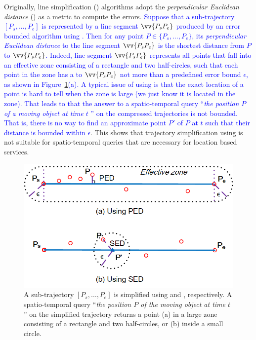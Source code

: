 Originally, line simplification (\lsa) algorithms adopt the \emph{perpendicular Euclidean distance} (\ped) as a metric to compute the errors.
\textcolor{blue}{Suppose that a sub-trajectory $[P_s, ..., P_e]$ is represented by a line segment $\vv{P_sP_e}$  produced by an error bounded \lsa algorithm using \ped. Then for any point $P \in \{P_s, ..., P_e\}$, its \emph{perpendicular Euclidean distance} to the line segment $\vv{P_sP_e}$  is the shortest distance from $P$ to $\vv{P_sP_e}$.}
\textcolor{blue}{Indeed, line segment $\vv{P_sP_e}$ represents all points that fall into an effective zone consisting of a rectangle and two half-circles, such that each point in the zone has a \ped to $\vv{P_sP_e}$ not more than a predefined error bound $\epsilon$,  as shown in Figure~\ref{fig:distances}(a).}
\textcolor{blue}{A typical issue of using \ped is that the exact location of a point is hard to tell when the zone is large (we just know it is located in the zone).}
%
\textcolor{blue}{That leads to that the answer to a spatio-temporal query ``\emph{the position $P$ of a moving object at time $t$} \cite{Cao:Spatio}'' on the compressed trajectories is not bounded. That is, there is no way to find an approximate point $P'$ of $P$ at $t$ such that their distance is bounded within $\epsilon$}.
This shows that trajectory simplification using \ped is not suitable for spatio-temporal queries that are necessary for location based services.
%



\begin{figure}[tb!]
\centering
\includegraphics[scale=1.2]{figures/Fig-Distances.png}
\caption{\small A sub-trajectory $[P_s, \ldots, P_e]$ is simplified using \ped and \sed, respectively. A spatio-temporal query ``\emph{the position $P$ of the moving object at time $t$}'' on the simplified trajectory returns a point (a) in a large zone consisting of a rectangle and two half-circles, or (b) inside a small circle.}
\vspace{-3ex}
\label{fig:distances}
\end{figure}

